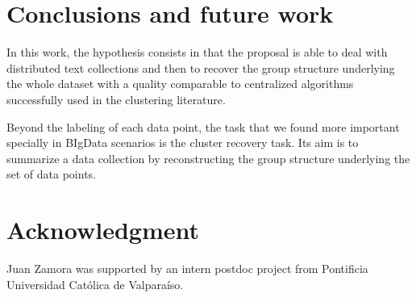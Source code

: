 \documentclass[a4paper]{article}
\begin{document}
\section{Conclusions and future work}
In this work, the hypothesis consists in that the proposal is able to deal with distributed text collections and then to recover the group structure underlying the whole dataset with a quality comparable to centralized algorithms successfully used in the clustering literature.


Beyond the labeling of each data point, the task that we found more important specially in BIgData scenarios is the cluster recovery task. Its aim is to summarize a data collection by reconstructing the group structure underlying the set of data points.






\section{Acknowledgment}
Juan Zamora was supported by an intern postdoc project from Pontificia Universidad Cat\'olica de Valpara\'iso.
\clearpage 
\end{document}
